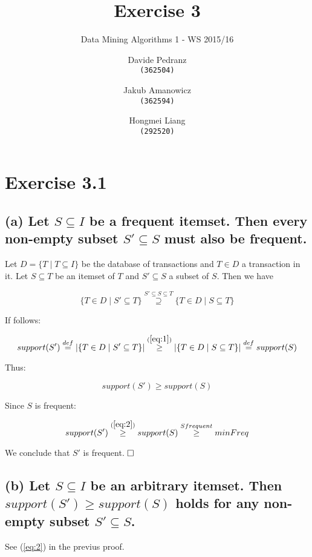\documentclass{scrartcl}
\title{Exercise 3}
\subtitle{Data Mining Algorithms 1 - WS 2015/16}
\author{
  Davide Pedranz\\ \texttt{(362504)}
  \and
  Jakub Amanowicz \\ \texttt{(362594)}
  \and
  Hongmei Liang\\  \texttt{(292520)}
}
\newcommand{\qed}{$\hfill\square$}
\begin{document}
\maketitle

\section*{Exercise 3.1}

\subsection*{(a) Let $S \subseteq I$ be a frequent itemset. Then every non-empty subset $S' \subseteq S$ must also be
frequent.}

Let $D = \{T \mid T \subseteq I\}$ be the database of transactions and $T \in D$ a transaction in it.
Let $S \subseteq T$ be an itemset of $T$  and $S' \subseteq S$ a subset of $S$. Then we have

\begin{equation} \label{eq:1}
\{ T \in D \mid S' \subseteq T \} \overset{S' \subseteq S \subseteq T}{\supseteq}  \{ T \in D \mid S \subseteq T \}
\end{equation}

If follows:

\begin{equation*}
support(S') \overset{def}{=} |\{ T \in D \mid S' \subseteq T \}| \overset{(\ref{eq:1})}{\geq} |\{ T \in D \mid S \subseteq T \}| \overset{def}{=} support(S)
\end{equation*}

Thus:

\begin{equation} \label{eq:2}
support(S') \geq support(S)
\end{equation}

Since $S$ is frequent:

\begin{equation*}
support(S') \overset{(\ref{eq:2})}{\geq} support(S) \overset{S frequent}{\geq} minFreq
\end{equation*}

We conclude that $S'$ is frequent. \qed

\subsection*{(b) Let $S \subseteq I$ be an arbitrary itemset. Then $support(S') \geq support(S)$ holds for any non-
empty subset $S' \subseteq S$.}

See (\ref{eq:2}) in the previus proof.
\end{document}
